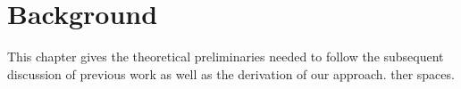 \chapter{Background}\label{ch:3}

This chapter gives the theoretical preliminaries needed to follow the subsequent discussion of previous work as well as the derivation of our approach. 
ther spaces.